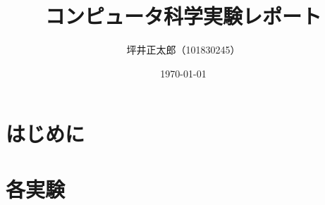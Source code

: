 \documentclass[a4paper,15pt]{jsarticle}
\begin{document}
\title{コンピュータ科学実験レポート}
\author{坪井正太郎（101830245）}
\date{\today}
\maketitle

\section*{はじめに}

\section*{各実験}







\end{document}
